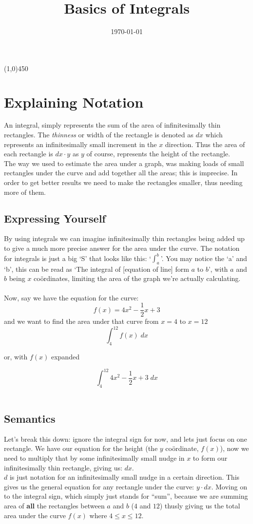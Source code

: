 \documentclass[7pt]{article}
\begin{document}
  \title{Basics of Integrals}
  \date{\today}
  \maketitle
  \tableofcontents
  \centerline{\line(1,0){450}}

  \section[Explanation]{Explaining Notation}

  An integral, simply represents the sum of the area of infinitesimally thin
  rectangles. The \textit{thinness} or width of the rectangle is denoted as $dx$
  which represents an infinitesimally small increment in the $x$ direction.
  Thus the area of each rectangle is $dx \cdot y$ as $y$ of course, represents the
  height of the rectangle.\\

  The way we used to estimate the area under a graph, was making loads of small
  rectangles under the curve and add together all the areas; this is imprecise.
  In order to get better results we need to make the rectangles smaller, thus
  needing more of them.\\
  
  \subsection{Expressing Yourself}
  By using integrals we can imagine infinitesimally thin rectangles being added up
  to give a much more precise answer for the area under the curve. The notation
  for integrals is just a big `S' that looks like this: `$\int_{a}^{b}$'. You may
  notice the `a' and `b', this can be read as `The integral of [equation of line] form $a$ to $b$',
  with $a$ and $b$ being $x$ co\"{o}rdinates, limiting the area of the graph we're actually
  calculating.\\\\
  Now, say we have the equation for the curve:
  \[ f(x) = 4x^2 - \frac{1}{2}x + 3 \]
  and we want to find the area under that curve from $x = 4$ to $x = 12$
  \[ \int_{4}^{12} f(x)\;dx \]
  \centerline{or, with $f(x)$ expanded}
  \[ \int_{4}^{12} 4x^2 - \frac{1}{2}x + 3\;dx \]\\
  \subsection{Semantics}
  Let's break this down: ignore the integral sign for now, and lets just focus
  on one rectangle. We have our equation for the height (the $y$ co\"ordinate, $f(x)$),
  now we need to multiply that by some infinitesimally small nudge in $x$ to form our
  infinitesimally thin rectangle, giving us: $dx$.\\

  $d$ is just notation for an infinitesimally small nudge in a certain direction.
  This gives us the general equation for any rectangle under the curve: $y \cdot dx$.
  Moving on to the integral sign, which simply just stands for ``sum'',
  because we are summing area of \textbf{all} the rectangles between $a$ and $b$
  ($4$ and $12$) thusly giving us the total area under the curve $f(x)$ 
  where $4 \leq x \leq 12$.
\end{document}
